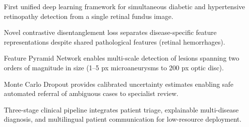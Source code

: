 \documentclass[review,12pt]{elsarticle}
\begin{document}
\begin{highlights}
\item First unified deep learning framework for simultaneous diabetic and hypertensive retinopathy detection from a single retinal fundus image.
\item Novel contrastive disentanglement loss separates disease-specific feature representations despite shared pathological features (retinal hemorrhages).
\item Feature Pyramid Network enables multi-scale detection of lesions spanning two orders of magnitude in size (1--5 px microaneurysms to 200 px optic disc).
\item Monte Carlo Dropout provides calibrated uncertainty estimates enabling safe automated referral of ambiguous cases to specialist review.
\item Three-stage clinical pipeline integrates patient triage, explainable multi-disease diagnosis, and multilingual patient communication for low-resource deployment.
\end{highlights}
\end{document}
